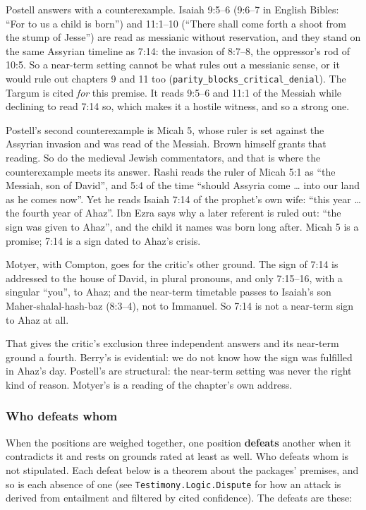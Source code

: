 \documentclass[11pt]{article}
\begin{document}
Postell answers with a counterexample. Isaiah 9:5–6 (9:6–7 in English Bibles: “For to us a child is born”) and 11:1–10 (“There shall come forth a shoot from the stump of Jesse”) are read as messianic without reservation, and they stand on the same Assyrian timeline as 7:14: the invasion of 8:7–8, the oppressor’s rod of 10:5. So a near-term setting cannot be what rules out a messianic sense, or it would rule out chapters 9 and 11 too (\texttt{parity\_\allowbreak{}blocks\_\allowbreak{}critical\_\allowbreak{}denial}). The Targum is cited \emph{for} this premise. It reads 9:5–6 and 11:1 of the Messiah while declining to read 7:14 so, which makes it a hostile witness, and so a strong one.

Postell’s second counterexample is Micah 5, whose ruler is set against the Assyrian invasion and was read of the Messiah. Brown himself grants that reading. So do the medieval Jewish commentators, and that is where the counterexample meets its answer. Rashi reads the ruler of Micah 5:1 as “the Messiah, son of David”, and 5:4 of the time “should Assyria come … into our land as he comes now”. Yet he reads Isaiah 7:14 of the prophet’s own wife: “this year … the fourth year of Ahaz”. Ibn Ezra says why a later referent is ruled out: “the sign was given to Ahaz”, and the child it names was born long after. Micah 5 is a promise; 7:14 is a sign dated to Ahaz’s crisis.

Motyer, with Compton, goes for the critic’s other ground. The sign of 7:14 is addressed to the house of David, in plural pronouns, and only 7:15–16, with a singular “you”, to Ahaz; and the near-term timetable passes to Isaiah’s son Maher-shalal-hash-baz (8:3–4), not to Immanuel. So 7:14 is not a near-term sign to Ahaz at all.

That gives the critic’s exclusion three independent answers and its near-term ground a fourth. Berry’s is evidential: we do not know how the sign was fulfilled in Ahaz’s day. Postell’s are structural: the near-term setting was never the right kind of reason. Motyer’s is a reading of the chapter’s own address.

\subsubsection*{Who defeats whom}
When the positions are weighed together, one position \textbf{defeats} another when it contradicts it and rests on grounds rated at least as well. Who defeats whom is not stipulated. Each defeat below is a theorem about the packages’ premises, and so is each absence of one (see \texttt{Testimony.Logic.Dispute} for how an attack is derived from entailment and filtered by cited confidence). The defeats are these:
\end{document}
